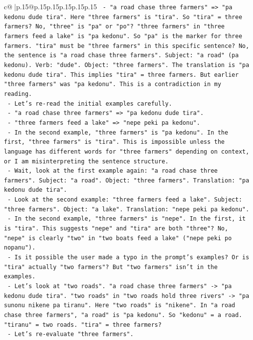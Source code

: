 \documentclass{article}
\begin{document}
{\begin{supertabular}{c@{$\;$}|p{.15\linewidth}@{}p{.15\linewidth}p{.15\linewidth}p{.15\linewidth}p{.15\linewidth}p{.15\linewidth}}
{{{\texttt{     {-} "a road chase three farmers" => "pa kedonu dude tira". Here "three farmers" is "tira". So "tira" = three farmers? No, "three" is "pa" or "po"? "three farmers" in "three farmers feed a lake" is "pa kedonu". So "pa" is the marker for three farmers. "tira" must be "three farmers" in this specific sentence? No, the sentence is "a road chase three farmers". Subject: "a road" (pa kedonu). Verb: "dude". Object: "three farmers". The translation is "pa kedonu dude tira". This implies "tira" = three farmers. But earlier "three farmers" was "pa kedonu". This is a contradiction in my reading.} \\
\texttt{     {-} Let's re{-}read the initial examples carefully.} \\
\texttt{       {-} "a road chase three farmers" => "pa kedonu dude tira".} \\
\texttt{       {-} "three farmers feed a lake" => "nepe peki pa kedonu".} \\
\texttt{       {-} In the second example, "three farmers" is "pa kedonu". In the first, "three farmers" is "tira". This is impossible unless the language has different words for "three farmers" depending on context, or I am misinterpreting the sentence structure.} \\
\texttt{       {-} Wait, look at the first example again: "a road chase three farmers". Subject: "a road". Object: "three farmers". Translation: "pa kedonu dude tira".} \\
\texttt{       {-} Look at the second example: "three farmers feed a lake". Subject: "three farmers". Object: "a lake". Translation: "nepe peki pa kedonu".} \\
\texttt{       {-} In the second example, "three farmers" is "nepe". In the first, it is "tira". This suggests "nepe" and "tira" are both "three"? No, "nepe" is clearly "two" in "two boats feed a lake" ("nepe peki po nopanu").} \\
\texttt{       {-} Is it possible the user made a typo in the prompt's examples? Or is "tira" actually "two farmers"? But "two farmers" isn't in the examples.} \\
\texttt{       {-} Let's look at "two roads". "a road chase three farmers" {-}> "pa kedonu dude tira". "two roads" in "two roads hold three rivers" {-}> "pa sunonu nikene pa tiranu". Here "two roads" is "nikene". In "a road chase three farmers", "a road" is "pa kedonu". So "kedonu" = a road. "tiranu" = two roads. "tira" = three farmers?} \\
\texttt{       {-} Let's re{-}evaluate "three farmers".} \\
}}}
\end{supertabular}}
\end{document}
